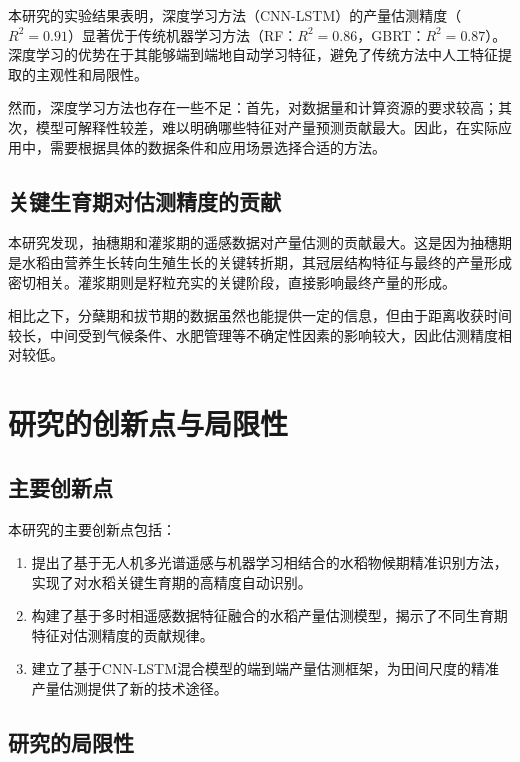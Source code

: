 本研究的实验结果表明，深度学习方法（CNN-LSTM）的产量估测精度（$R^2=0.91$）显著优于传统机器学习方法（RF：$R^2=0.86$，GBRT：$R^2=0.87$）。深度学习的优势在于其能够端到端地自动学习特征，避免了传统方法中人工特征提取的主观性和局限性。

然而，深度学习方法也存在一些不足：首先，对数据量和计算资源的要求较高；其次，模型可解释性较差，难以明确哪些特征对产量预测贡献最大。因此，在实际应用中，需要根据具体的数据条件和应用场景选择合适的方法。

\subsection{关键生育期对估测精度的贡献}
\label{subsec:key_stage}

本研究发现，抽穗期和灌浆期的遥感数据对产量估测的贡献最大。这是因为抽穗期是水稻由营养生长转向生殖生长的关键转折期，其冠层结构特征与最终的产量形成密切相关。灌浆期则是籽粒充实的关键阶段，直接影响最终产量的形成。

相比之下，分蘖期和拔节期的数据虽然也能提供一定的信息，但由于距离收获时间较长，中间受到气候条件、水肥管理等不确定性因素的影响较大，因此估测精度相对较低。

\section{研究的创新点与局限性}
\label{sec:innovation}

\subsection{主要创新点}
\label{subsec:innovation}

本研究的主要创新点包括：

\begin{enumerate}[itemsep=0pt,parsep=0pt]
  \item 提出了基于无人机多光谱遥感与机器学习相结合的水稻物候期精准识别方法，实现了对水稻关键生育期的高精度自动识别。
  \item 构建了基于多时相遥感数据特征融合的水稻产量估测模型，揭示了不同生育期特征对估测精度的贡献规律。
  \item 建立了基于CNN-LSTM混合模型的端到端产量估测框架，为田间尺度的精准产量估测提供了新的技术途径。
\end{enumerate}

\subsection{研究的局限性}
\label{subsec:limitations}

